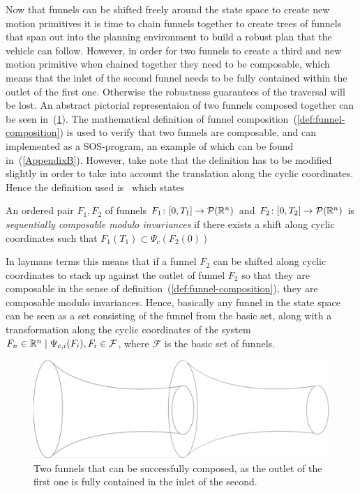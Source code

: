Now that funnels can be shifted freely around the state space to create new
motion primitives it is time to chain funnels together to create trees of
funnels that span out into the planning environment to build a robust plan that
the vehicle can follow. However, in order for two funnels to create a third and
new motion primitive when chained together they need to be composable, which
means that the inlet of the second funnel needs to be fully contained within the
outlet of the first one. Otherwise the robustness guarantees of the traversal
will be lost. An abstract pictorial representaion of two funnels composed
together can be seen in~(\ref{fig:two-funnels-composed}). The mathematical
definition of funnel composition~(\ref{def:funnel-composition}) is used to
verify that two funnels are composable, and can implemented as a
\ac{SOS}-program, an example of which can be found in~(\ref{AppendixB}).
However, take note that the definition has to be modified slightly in order to
take into account the translation along the cyclic coordinates. Hence the
definition used
is~\cite[definition~3,sec~5]{majumdarFunnelLibrariesRealtime2017} which states
\begin{definition}
  An ordered pair \(F_1,F_2\) of funnels \(F_1 \colon [0,T_1] \rightarrow
  \mathcal{P}(\mathbb{R}^n)\) and \(F_2 \colon [0,T_2] \rightarrow \mathcal{P}(\mathbb{R}^n)\)
  is \textit{sequentially composable modulo invariances} if there exists a shift
  along cyclic coordinates such that \(F_{1}(T_1) \subset
  \Psi_{c}\left(F_2(0)\right)\)
\end{definition}
In laymans terms this means that if a funnel \(F_2\) can be shifted along cyclic
coordinates to stack up against the outlet of funnel \(F_2\) so that they are
composable in the sense of definition~(\ref{def:funnel-composition}), they are
composable modulo invariances. Hence, basically any funnel in the state space
can be seen as a set consisting of the funnel from the basic set, along with a
transformation along the cyclic coordinates of the system \(F_n \in \mathbb{R}^n \mid
\Psi_{c,i}(F_i), F_i \in \mathcal{F}\), where \(\mathcal{F}\) is the basic set
of funnels.

\begin{figure}
  \includegraphics[scale=.2]{figures/method/funnel-composition} \centering
  \caption{Two funnels that can be successfully composed, as the outlet of the
    first one is fully contained in the inlet of the second.}
  \label{fig:two-funnels-composed}
\end{figure}

